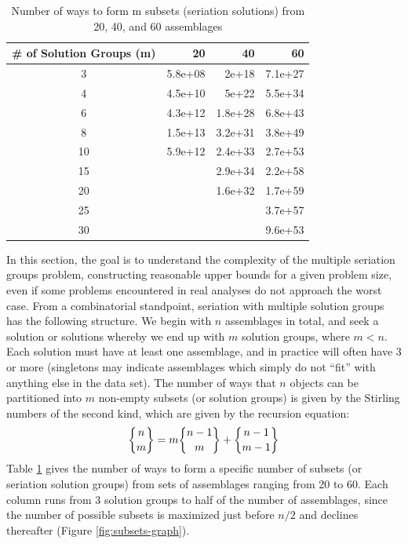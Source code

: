 \begin{table}[ht]
\centering
\begin{tabular}{|c|r|r|r|}
  \hline
\# of Solution Groups (m) & 20 & 40 & 60 \\ 
  \hline
  3 & 5.8e+08 & 2e+18 & 7.1e+27 \\ 
    4 & 4.5e+10 & 5e+22 & 5.5e+34 \\ 
    6 & 4.3e+12 & 1.8e+28 & 6.8e+43 \\ 
    8 & 1.5e+13 & 3.2e+31 & 3.8e+49 \\ 
   10 & 5.9e+12 & 2.4e+33 & 2.7e+53 \\ 
   15 &  & 2.9e+34 & 2.2e+58 \\ 
   20 &  & 1.6e+32 & 1.7e+59 \\ 
   25 &  &  & 3.7e+57 \\ 
   30 &  &  & 9.6e+53 \\ 
   \hline
\end{tabular}
\caption{Number of ways to form m subsets (seriation solutions) from 20, 40, and 60 assemblages} 
\label{tab:subsets}
\end{table}


In this section, the goal is to understand the complexity of the multiple seriation groups problem, constructing reasonable upper bounds for a given problem size, even if some problems encountered in real analyses do not approach the worst case.  From a combinatorial standpoint, seriation with multiple solution groups has the following structure.  
We begin with $n$ assemblages in total, and seek a solution or solutions whereby we end up with $m$ solution groups, where $m < n$.  Each solution must have at least one assemblage, and in practice will often have 3 or more (singletons may indicate assemblages which simply do not ``fit'' with anything else in the data set).  The number of ways that $n$ objects can be partitioned into $m$ non-empty subsets (or solution groups) is given by the Stirling numbers of the second kind, which are given by the recursion equation:
\begin{equation}
\stirlingsubset{n}{m} = m \stirlingsubset{n-1}{m} + \stirlingsubset{n-1}{m-1}
\end{equation}
Table \ref{tab:subsets} gives the number of ways to form a specific number of subsets (or seriation solution groups) from sets of assemblages ranging from 20 to 60.  Each column runs from 3 solution groups to half of the number of assemblages, since the number of possible subsets is maximized just before $n/2$ and declines thereafter (Figure \ref{fig:subsets-graph}).  

